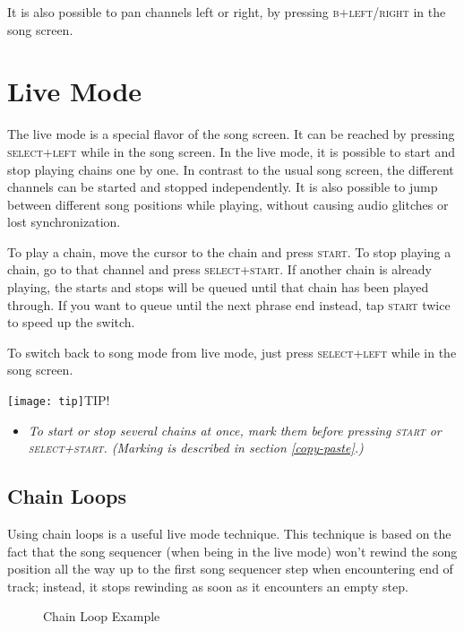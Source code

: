 It is also possible to pan channels left or right, by pressing \textsc{b+left/right} in the song screen.

\section{Live Mode}

 The live mode is a special flavor of the song screen. It can be reached by pressing \textsc{select+left} while in the song screen. In the live mode, it is possible to start and stop playing chains one by one. In contrast to the usual song screen, the different channels can be started and stopped independently. It is also possible to jump between different song positions while playing, without causing audio glitches or lost synchronization.

To play a chain, move the cursor to the chain and press \textsc{start}. To stop playing a chain, go to that channel and press \textsc{select+start}. If another chain is already playing, the starts and stops will be queued until that chain has been played through. If you want to queue until the next phrase end instead, tap \textsc{start} twice to speed up the switch.

To switch back to song mode from live mode, just press \textsc{select+left} while in the song screen.

\texttt{[image: tip]}TIP!
\begin{itemize}
        \item \textit{To start or stop several chains at once, mark them before pressing \textsc{start} or \textsc{select+start}. (Marking is described in section \ref{copy-paste}.)}
	\end{itemize}

\subsection{Chain Loops}

 Using chain loops is a useful live mode technique. This technique is based on the fact that the song sequencer (when being in the live mode) won't rewind the song position all the way up to the first song sequencer step when encountering end of track; instead, it stops rewinding as soon as it encounters an empty step.

\begin{figure}[htpb]
	\begin{center}
	\end{center}
	\caption{Chain Loop Example}
	\label{fig:chainloop}
\end{figure}

